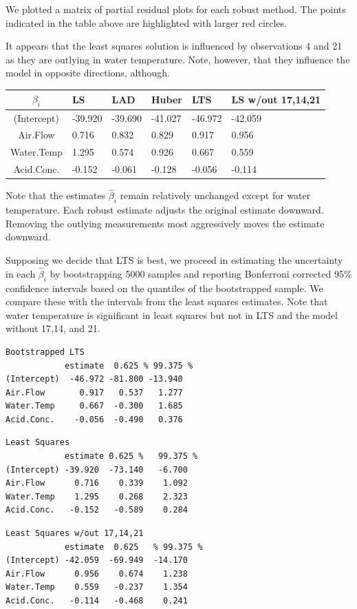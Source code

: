\documentclass{homework}
\begin{document}
\begin{solution}
\begin{minipage}{.5\textwidth}
We plotted a matrix of partial residual plots for each robust method.  The
points indicated in the table above are highlighted with larger red circles.

It appears that the least squares solution is influenced by observations 4 and 21
as they are outlying in water temperature.  Note, however, that they influence the
model in opposite directions, although.  
\end{minipage}
\begin{tabular}{c | l l l l l}
$\beta_i$  & LS & LAD & Huber & LTS & LS w/out 17,14,21\\\hline
(Intercept)& -39.920& -39.690& -41.027& -46.972& -42.059\\
Air.Flow   &   0.716&   0.832&   0.829&   0.917&   0.956\\
Water.Temp &   1.295&   0.574&   0.926&   0.667&   0.559\\
Acid.Conc. &  -0.152&  -0.061&  -0.128&  -0.056&  -0.114\\\hline
\end{tabular}

Note that the estimates $\widehat \beta_i$ remain relatively unchanged except for water temperature.  Each robust estimate adjusts the original estimate downward. Removing the outlying measurements most aggressively moves the estimate downward. 

Supposing we decide that LTS is best, we proceed in estimating the uncertainty in each $\widehat \beta_i$ by bootstrapping 5000 samples and reporting Bonferroni corrected 95\% confidence intervals based on the quantiles of the bootstrapped sample. We compare these with the intervals from the least squares estimates. Note that water temperature is significant in least squares but not in LTS and the model without 17,14, and 21.

\begin{verbatim}
Bootstrapped LTS
            estimate  0.625 % 99.375 %
(Intercept)  -46.972 -81.800 -13.940
Air.Flow       0.917   0.537   1.277
Water.Temp     0.667  -0.300   1.685
Acid.Conc.    -0.056  -0.490   0.376
\end{verbatim}

\begin{verbatim}
Least Squares
            estimate 0.625 %   99.375 %
(Intercept) -39.920  -73.140   -6.700
Air.Flow      0.716    0.339    1.092
Water.Temp    1.295    0.268    2.323
Acid.Conc.   -0.152   -0.589    0.284
\end{verbatim}

\begin{verbatim}
Least Squares w/out 17,14,21
            estimate  0.625   % 99.375 %
(Intercept) -42.059  -69.949  -14.170
Air.Flow      0.956    0.674    1.238
Water.Temp    0.559   -0.237    1.354
Acid.Conc.   -0.114   -0.468    0.241
\end{verbatim}

\end{solution}
\end{document}
